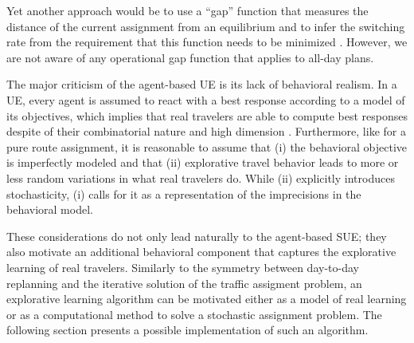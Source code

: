 Yet another approach would be to use a ``gap'' function that measures the
distance of the current assignment from an equilibrium and to infer
the switching rate from the requirement that this function needs to
be minimized 
\citep{LuMahmassaniZhou2009GapDue,zhang-2008}.
However, we are not aware of any operational gap function that applies to all-day plans.

The major criticism of the agent-based UE is its lack of behavioral realism.
In a UE, every agent is assumed to react with a best response 
according to a model of its objectives, which implies 
that real travelers are able to compute best responses
despite of their combinatorial nature and high dimension
\citep{bowman-1998}.
Furthermore, like for a pure route assignment, it
is reasonable to assume that (i) the behavioral objective is
imperfectly modeled and that (ii) explorative travel behavior leads
to more or less random variations in what real travelers do.
While (ii) explicitly introduces stochasticity, (i) calls for it as a
representation of the imprecisions in the behavioral model.

These considerations do not only lead naturally to the agent-based SUE;
they also motivate an additional behavioral component that captures
the explorative learning of real travelers. Similarly to the symmetry
between day-to-day replanning and the iterative solution of the traffic assigment
problem, an explorative learning algorithm can be motivated either as
a model of real learning or as a computational method to solve a stochastic
assignment problem. The following section presents a possible implementation
of such an algorithm. 



